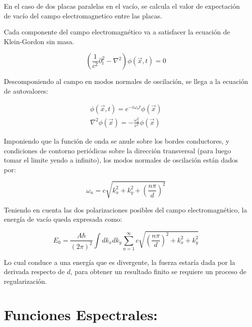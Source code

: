 En el caso de dos placas paralelas en el vacío, se calcula el valor de expectación de vacío del campo electromagnetico entre las placas. 


Cada componente del campo electromagnético va a satisfacer la ecuación de Klein-Gordon sin masa.





\begin{equation}
( \frac{1}{c^2} \partial _t ^2 - \nabla  ^2  ) \phi (\vec{x} ,t) = 0 
\end{equation}

Descomponiendo al campo en modos normales de oscilación, se llega a la ecuación de autovalores:

\begin{equation}
\begin{array}{c}
\phi ( \vec{x},t) = e ^{-i \omega _n t} \phi ( \vec{x}) \\
\nabla ^2 \phi ( \vec{x}) = - \frac{\omega _n ^2}{c ^2} \phi ( \vec{x})
\end{array}
\end{equation}

Imponiendo que la función de onda se anule sobre los bordes conductores, y condiciones de contorno periódicas sobre la dirección transversal (para luego tomar el limite yendo a infinito), los modos normales de oscilación están dados por:

\begin{equation}
\omega _n = c \sqrt{ k _x ^2 + k _y ^2 + \left( \frac{n \pi}{d} \right) ^2 }
\end{equation}

Teniendo en cuenta las dos polarizaciones posibles del campo electromagnético, la energía de vacío queda expresada como:

\begin{equation}
E _0 = \frac{A \hbar }{(2 \pi) ^2} \int dk _x dk _y 
\sum _{n=1} ^{\infty} 
c
\sqrt{
		\left( \frac{n \pi}{d} \right) ^2 + k _x ^2 + k _y ^2
		}
\end{equation}


Lo cual conduce a una energía que es divergente, la fuerza estaría dada por la derivada respecto de $d$, para obtener un resultado finito se requiere un proceso de regularización.

\section{Funciones Espectrales:}


